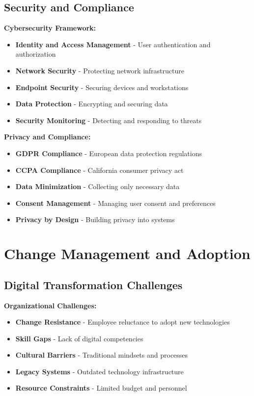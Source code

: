 \documentclass[12pt]{article}
\begin{document}
\subsection{Security and Compliance}

\textbf{Cybersecurity Framework:}
\begin{itemize}
    \item \textbf{Identity and Access Management} - User authentication and authorization
    \item \textbf{Network Security} - Protecting network infrastructure
    \item \textbf{Endpoint Security} - Securing devices and workstations
    \item \textbf{Data Protection} - Encrypting and securing data
    \item \textbf{Security Monitoring} - Detecting and responding to threats
\end{itemize}

\textbf{Privacy and Compliance:}
\begin{itemize}
    \item \textbf{GDPR Compliance} - European data protection regulations
    \item \textbf{CCPA Compliance} - California consumer privacy act
    \item \textbf{Data Minimization} - Collecting only necessary data
    \item \textbf{Consent Management} - Managing user consent and preferences
    \item \textbf{Privacy by Design} - Building privacy into systems
\end{itemize}

\section{Change Management and Adoption}

\subsection{Digital Transformation Challenges}

\textbf{Organizational Challenges:}
\begin{itemize}
    \item \textbf{Change Resistance} - Employee reluctance to adopt new technologies
    \item \textbf{Skill Gaps} - Lack of digital competencies
    \item \textbf{Cultural Barriers} - Traditional mindsets and processes
    \item \textbf{Legacy Systems} - Outdated technology infrastructure
    \item \textbf{Resource Constraints} - Limited budget and personnel
\end{itemize}
\end{document}
